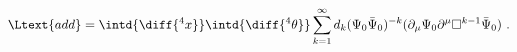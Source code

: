 \begin{equation}
  \label{eq:addlag}
  \Ltext{add} = \intd{\diff{^4x}} \intd{\diff{^4 \theta}} \sum_{k = 1}^\infty d_k (\Psi_0
  \bar{\Psi}_0)^{-k} (\partial_\mu \Psi_0 \partial^\mu \Box^{k-1}
  \bar{\Psi}_0)\ .
\end{equation}

